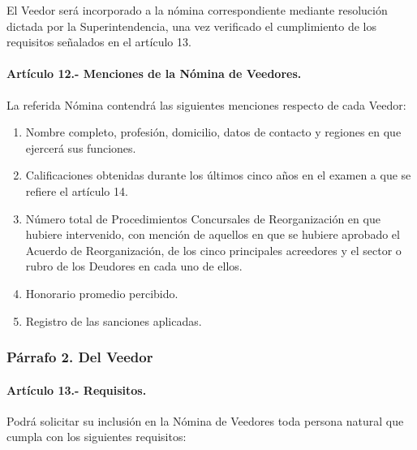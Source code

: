 \documentclass[
]{book}
\begin{document}
El Veedor será incorporado a la nómina correspondiente mediante resolución dictada por la Superintendencia, una vez verificado el cumplimiento de los requisitos señalados en el artículo 13.

\hypertarget{artuxedculo-12.--menciones-de-la-nuxf3mina-de-veedores.}{%
\paragraph*{Artículo 12.- Menciones de la Nómina de Veedores.}\label{artuxedculo-12.--menciones-de-la-nuxf3mina-de-veedores.}}

La referida Nómina contendrá las siguientes menciones respecto de cada Veedor:

\begin{enumerate}
\def\labelenumi{\arabic{enumi})}
\item
  Nombre completo, profesión, domicilio, datos de contacto y regiones en que ejercerá sus funciones.
\item
  Calificaciones obtenidas durante los últimos cinco años en el examen a que se refiere el artículo 14.
\item
  Número total de Procedimientos Concursales de Reorganización en que hubiere intervenido, con mención de aquellos en que se hubiere aprobado el Acuerdo de Reorganización, de los cinco principales acreedores y el sector o rubro de los Deudores en cada uno de ellos.
\item
  Honorario promedio percibido.
\item
  Registro de las sanciones aplicadas.
\end{enumerate}

\hypertarget{puxe1rrafo-2.-del-veedor}{%
\subsubsection*{Párrafo 2. Del Veedor}\label{puxe1rrafo-2.-del-veedor}}

\hypertarget{artuxedculo-13.--requisitos.}{%
\paragraph*{Artículo 13.- Requisitos.}\label{artuxedculo-13.--requisitos.}}

Podrá solicitar su inclusión en la Nómina de Veedores toda persona natural que cumpla con los siguientes requisitos:
\end{document}
